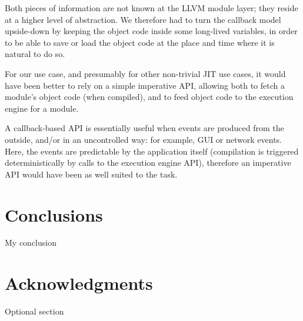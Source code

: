 \documentclass{acm_proc_article-sp}
\begin{document}
Both pieces of information are not known at the LLVM module layer;
they reside at a higher level of abstraction.  We therefore had to
turn the callback model upside-down by keeping the object code inside
some long-lived variables, in order to be able to save or load
the object code at the place and time where it is natural to do so.

For our use case, and presumably for other non-trivial JIT use cases,
it would have been better to rely on a simple imperative API, allowing
both to fetch a module's object code (when compiled), and to feed object
code to the execution engine for a module.

A callback-based API is essentially useful when events are produced from
the outside, and/or in an uncontrolled way: for example, GUI or network
events.  Here, the events are predictable by the application
itself (compilation is triggered deterministically by calls to the
execution engine API), therefore an imperative API would have been as
well suited to the task.

\section{Conclusions}
My conclusion

\section{Acknowledgments}
Optional section

%

%
%


\end{document}
